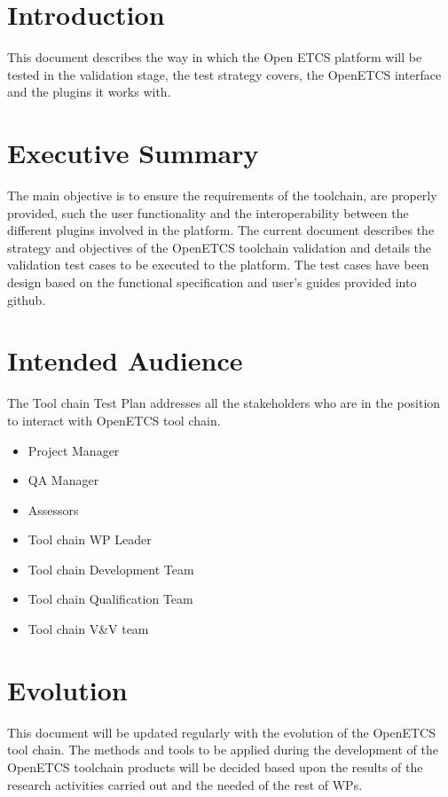 \section{Introduction}
\label{sec:Introduction}


This document describes the way in which the Open ETCS platform will be tested in the validation stage, the test strategy covers, the OpenETCS interface and the plugins it works with.

\section{Executive Summary}
\label{sec-1-2}
The main objective is to ensure the requirements of the toolchain, are properly provided, such the user functionality and the interoperability between the different plugins involved in the platform.
The current document describes the strategy and objectives of the OpenETCS toolchain validation and details the validation test cases to be executed to the platform. The test cases have been design based on the functional specification and user’s guides provided into github.

\section{Intended Audience}
\label{sec-1-3}

The Tool chain Test Plan addresses all the stakeholders who are in the position to interact with OpenETCS tool chain.

\begin{itemize}
\item Project Manager
\item QA Manager
\item Assessors
\item Tool chain WP Leader
\item Tool chain Development Team
\item Tool chain Qualification Team
\item Tool chain V\&V team
\end{itemize}

\section{Evolution}

This document will be updated regularly with the evolution of the OpenETCS tool chain. The methods and tools to be applied during the development of the OpenETCS toolchain products will be decided based upon the results of the research activities carried out and the needed of the rest of WPs. 

